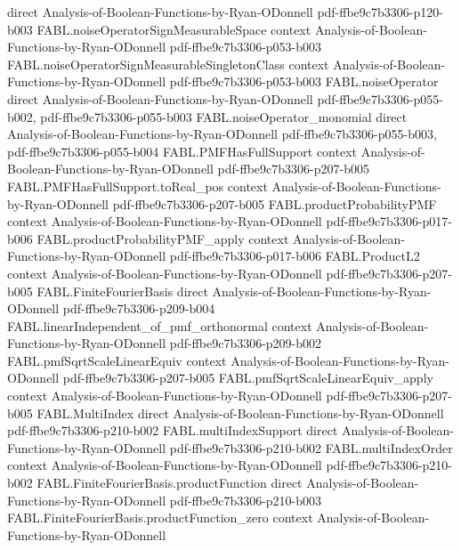 \begin{theorem}
  {direct}
  {Analysis-of-Boolean-Functions-by-Ryan-ODonnell}
  {pdf-ffbe9c7b3306-p120-b003}
\proofstep
  {FABL.noiseOperatorSignMeasurableSpace}
  {context}
  {Analysis-of-Boolean-Functions-by-Ryan-ODonnell}
  {pdf-ffbe9c7b3306-p053-b003}
\proofstep
  {FABL.noiseOperatorSignMeasurableSingletonClass}
  {context}
  {Analysis-of-Boolean-Functions-by-Ryan-ODonnell}
  {pdf-ffbe9c7b3306-p053-b003}
\proofstep
  {FABL.noiseOperator}
  {direct}
  {Analysis-of-Boolean-Functions-by-Ryan-ODonnell}
  {pdf-ffbe9c7b3306-p055-b002,
    pdf-ffbe9c7b3306-p055-b003}
\proofstep
  {FABL.noiseOperator_monomial}
  {direct}
  {Analysis-of-Boolean-Functions-by-Ryan-ODonnell}
  {pdf-ffbe9c7b3306-p055-b003,
    pdf-ffbe9c7b3306-p055-b004}
\proofstep
  {FABL.PMFHasFullSupport}
  {context}
  {Analysis-of-Boolean-Functions-by-Ryan-ODonnell}
  {pdf-ffbe9c7b3306-p207-b005}
\proofstep
  {FABL.PMFHasFullSupport.toReal_pos}
  {context}
  {Analysis-of-Boolean-Functions-by-Ryan-ODonnell}
  {pdf-ffbe9c7b3306-p207-b005}
\proofstep
  {FABL.productProbabilityPMF}
  {context}
  {Analysis-of-Boolean-Functions-by-Ryan-ODonnell}
  {pdf-ffbe9c7b3306-p017-b006}
\proofstep
  {FABL.productProbabilityPMF_apply}
  {context}
  {Analysis-of-Boolean-Functions-by-Ryan-ODonnell}
  {pdf-ffbe9c7b3306-p017-b006}
\proofstep
  {FABL.ProductL2}
  {context}
  {Analysis-of-Boolean-Functions-by-Ryan-ODonnell}
  {pdf-ffbe9c7b3306-p207-b005}
\proofstep
  {FABL.FiniteFourierBasis}
  {direct}
  {Analysis-of-Boolean-Functions-by-Ryan-ODonnell}
  {pdf-ffbe9c7b3306-p209-b004}
\proofstep
  {FABL.linearIndependent_of_pmf_orthonormal}
  {context}
  {Analysis-of-Boolean-Functions-by-Ryan-ODonnell}
  {pdf-ffbe9c7b3306-p209-b002}
\proofstep
  {FABL.pmfSqrtScaleLinearEquiv}
  {context}
  {Analysis-of-Boolean-Functions-by-Ryan-ODonnell}
  {pdf-ffbe9c7b3306-p207-b005}
\proofstep
  {FABL.pmfSqrtScaleLinearEquiv_apply}
  {context}
  {Analysis-of-Boolean-Functions-by-Ryan-ODonnell}
  {pdf-ffbe9c7b3306-p207-b005}
\proofstep
  {FABL.MultiIndex}
  {direct}
  {Analysis-of-Boolean-Functions-by-Ryan-ODonnell}
  {pdf-ffbe9c7b3306-p210-b002}
\proofstep
  {FABL.multiIndexSupport}
  {direct}
  {Analysis-of-Boolean-Functions-by-Ryan-ODonnell}
  {pdf-ffbe9c7b3306-p210-b002}
\proofstep
  {FABL.multiIndexOrder}
  {context}
  {Analysis-of-Boolean-Functions-by-Ryan-ODonnell}
  {pdf-ffbe9c7b3306-p210-b002}
\proofstep
  {FABL.FiniteFourierBasis.productFunction}
  {direct}
  {Analysis-of-Boolean-Functions-by-Ryan-ODonnell}
  {pdf-ffbe9c7b3306-p210-b003}
\proofstep
  {FABL.FiniteFourierBasis.productFunction_zero}
  {context}
  {Analysis-of-Boolean-Functions-by-Ryan-ODonnell}

\end{theorem}
